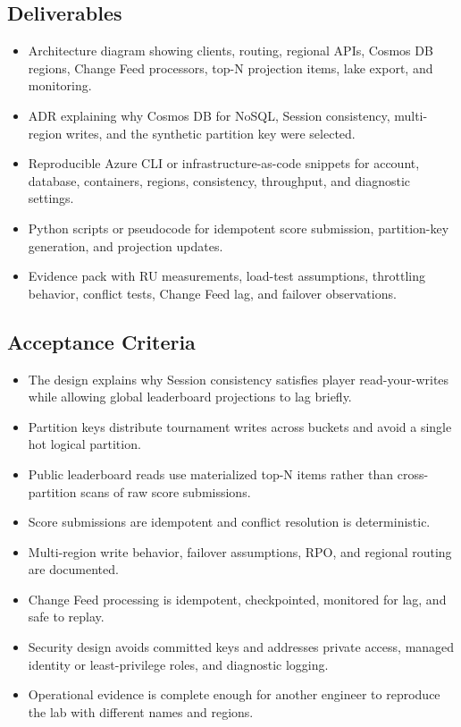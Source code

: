 \subsection*{Deliverables}
\begin{itemize}
    \item Architecture diagram showing clients, routing, regional APIs, Cosmos DB regions, Change Feed processors, top-N projection items, lake export, and monitoring.
    \item ADR explaining why Cosmos DB for NoSQL, Session consistency, multi-region writes, and the synthetic partition key were selected.
    \item Reproducible Azure CLI or infrastructure-as-code snippets for account, database, containers, regions, consistency, throughput, and diagnostic settings.
    \item Python scripts or pseudocode for idempotent score submission, partition-key generation, and projection updates.
    \item Evidence pack with RU measurements, load-test assumptions, throttling behavior, conflict tests, Change Feed lag, and failover observations.
\end{itemize}

\subsection*{Acceptance Criteria}
\begin{itemize}
    \item The design explains why Session consistency satisfies player read-your-writes while allowing global leaderboard projections to lag briefly.
    \item Partition keys distribute tournament writes across buckets and avoid a single hot logical partition.
    \item Public leaderboard reads use materialized top-N items rather than cross-partition scans of raw score submissions.
    \item Score submissions are idempotent and conflict resolution is deterministic.
    \item Multi-region write behavior, failover assumptions, RPO, and regional routing are documented.
    \item Change Feed processing is idempotent, checkpointed, monitored for lag, and safe to replay.
    \item Security design avoids committed keys and addresses private access, managed identity or least-privilege roles, and diagnostic logging.
    \item Operational evidence is complete enough for another engineer to reproduce the lab with different names and regions.
\end{itemize}

